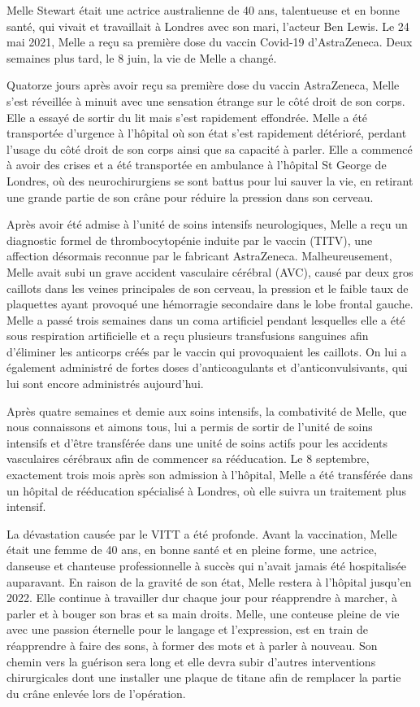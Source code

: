 Melle Stewart était une actrice australienne de 40 ans, talentueuse et en bonne
santé, qui vivait et travaillait à Londres avec son mari, l'acteur Ben Lewis. Le
24 mai 2021, Melle a reçu sa première dose du vaccin Covid-19
d'AstraZeneca. Deux semaines plus tard, le 8 juin, la vie de Melle a changé.

Quatorze jours après avoir reçu sa première dose du vaccin AstraZeneca, Melle
s'est réveillée à minuit avec une sensation étrange sur le côté droit de son
corps. Elle a essayé de sortir du lit mais s'est rapidement effondrée. Melle a
été transportée d'urgence à l'hôpital où son état s'est rapidement détérioré,
perdant l'usage du côté droit de son corps ainsi que sa capacité à parler. Elle
a commencé à avoir des crises et a été transportée en ambulance à l'hôpital St
George de Londres, où des neurochirurgiens se sont battus pour lui sauver la
vie, en retirant une grande partie de son crâne pour réduire la pression dans
son cerveau.

Après avoir été admise à l'unité de soins intensifs neurologiques, Melle a reçu
un diagnostic formel de thrombocytopénie induite par le vaccin (TITV), une
affection désormais reconnue par le fabricant AstraZeneca. Malheureusement,
Melle avait subi un grave accident vasculaire cérébral (AVC), causé par deux
gros caillots dans les veines principales de son cerveau, la pression et le
faible taux de plaquettes ayant provoqué une hémorragie secondaire dans le lobe
frontal gauche. Melle a passé trois semaines dans un coma artificiel pendant
lesquelles elle a été sous respiration artificielle et a reçu plusieurs
transfusions sanguines afin d'éliminer les anticorps créés par le vaccin qui
provoquaient les caillots. On lui a également administré de fortes doses
d'anticoagulants et d'anticonvulsivants, qui lui sont encore administrés
aujourd'hui.

Après quatre semaines et demie aux soins intensifs, la combativité de Melle, que
nous connaissons et aimons tous, lui a permis de sortir de l'unité de soins
intensifs et d'être transférée dans une unité de soins actifs pour les accidents
vasculaires cérébraux afin de commencer sa rééducation. Le 8 septembre,
exactement trois mois après son admission à l'hôpital, Melle a été transférée
dans un hôpital de rééducation spécialisé à Londres, où elle suivra un
traitement plus intensif.

La dévastation causée par le VITT a été profonde. Avant la vaccination, Melle
était une femme de 40 ans, en bonne santé et en pleine forme, une actrice,
danseuse et chanteuse professionnelle à succès qui n'avait jamais été
hospitalisée auparavant. En raison de la gravité de son état, Melle restera à
l'hôpital jusqu'en 2022. Elle continue à travailler dur chaque jour pour
réapprendre à marcher, à parler et à bouger son bras et sa main droits. Melle,
une conteuse pleine de vie avec une passion éternelle pour le langage et
l'expression, est en train de réapprendre à faire des sons, à former des mots et
à parler à nouveau. Son chemin vers la guérison sera long et elle devra subir
d'autres interventions chirurgicales dont une installer une plaque de titane
afin de remplacer la partie du crâne enlevée lors de l'opération.

